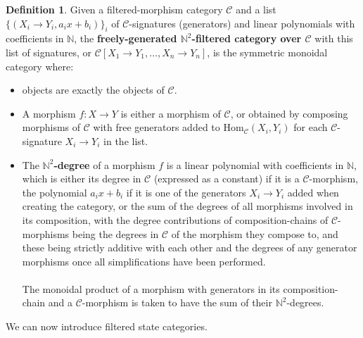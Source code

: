 \documentclass{article}
\theoremstyle{definition}
\newtheorem{definition}{Definition}[section]
\theoremstyle{remark}
\begin{document}
\begin{definition}
    \label{def:freegenfilteredmorphism} Given a filtered-morphism category
    $\mathcal{C}$ and a list $\{(X_i \to Y_i, a_ix+b_i)\}_{i}$ of
    $\mathcal{C}$-signatures (generators)
    and linear polynomials with coefficients
    in $\mathbb{N}$, the \textbf{freely-generated $\mathbb{N}^2$-filtered
    category over $\mathcal{C}$} with this list of signatures,
    or $\mathcal{C}[X_1\to Y_1,\dots, X_n \to Y_n]$, is the
    symmetric monoidal category
    where:
    \begin{itemize}
        \item objects are exactly the objects of $\mathcal{C}$.
        \item A morphism $f:X\to Y$ is either a morphism of
        $\mathcal{C}$, or obtained by composing morphisms of
        $\mathcal{C}$ with free generators added to
        $\mathrm{Hom}_{\mathcal{C}}(X_i,Y_i)$ for each
        $\mathcal{C}$-signature $X_i\to Y_i$ in the list.
        \item The \textbf{$\mathbb{N}^2$-degree} of a morphism $f$ is
        a linear polynomial with coefficients in
        $\mathbb{N}$, which is either its
        degree in $\mathcal{C}$ (expressed as a constant)
        if it is a $\mathcal{C}$-morphism, the polynomial $a_ix+b_i$ if
        it is one of the generators $X_i \to Y_i$ added when creating
        the category, or the sum of the degrees of all morphisms involved
        in its composition, with the degree
        contributions of composition-chains of
        $\mathcal{C}$-morphisms being the degrees in $\mathcal{C}$ of the
        morphism they compose to, and these being strictly additive 
        with each other and the degrees of any generator morphisms once
        all simplifications have been performed.
        \\ \\
        The monoidal product of
        a morphism with generators in its composition-chain and a
        $\mathcal{C}$-morphism is taken to have the sum of their
        $\mathbb{N}^2$-degrees.
    \end{itemize}
\end{definition}
We can now introduce filtered state categories.
\end{document}
